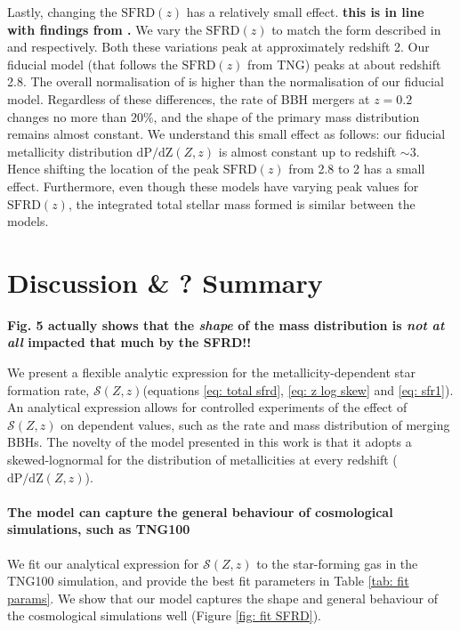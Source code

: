 \documentclass[twocolumn]{aastex631}
\newcommand{\SFRDzZ}{\ensuremath{\mathcal{S}(Z,z)}\xspace}
\newcommand{\SFRDz}{\ensuremath{\mathrm{SFRD}(z)}\xspace}
\newcommand{\dpdZ}{\ensuremath{\mathrm{dP/dZ}(Z,z)}\xspace}
\newcommand{\todo}[1]{{\color{purple}\bf{#1}}}
\begin{document}
Lastly, changing the \SFRDz has a relatively small effect. 
\todo{this is in line with findings from \citep{Tang+2020}.}
We vary the \SFRDz to match the form described in \cite{Madau+2017} and \cite{Neijssel+2019} respectively. Both these variations peak at approximately redshift 2. Our fiducial model (that follows the \SFRDz from TNG) peaks at about redshift 2.8. The overall normalisation of \cite{Neijssel+2019} is higher than the normalisation of our fiducial model. Regardless of these differences, the rate of BBH mergers at $z=0.2$ changes no more than $20\%$, and the shape of the primary mass distribution remains almost constant. We understand this small effect as follows: our fiducial metallicity distribution \dpdZ is almost constant up to redshift $\sim3$. Hence shifting the location of the peak \SFRDz from 2.8 to 2 has a small effect. Furthermore, even though these models have varying peak values for \SFRDz, the integrated total stellar mass formed is similar between the models. %


\section{Discussion \& ? Summary \label{sec: summary}}
\todo{\cite{chruslinska2022_review} Fig. 5 actually shows that the \textit{shape} of the mass distribution is \textit{not at all} impacted that much by the SFRD!!}

We present a flexible analytic expression for the metallicity-dependent star formation rate, \SFRDzZ (equations \ref{eq: total sfrd}, \ref{eq: z log skew} and \ref{eq: sfr1}). An analytical expression allows for controlled experiments of the effect of \SFRDzZ on dependent values, such as the rate and mass distribution of merging BBHs. The novelty of the model presented in this work is that it adopts a skewed-lognormal for the distribution of metallicities at every redshift (\dpdZ). 

\paragraph{The model can capture the general behaviour of cosmological simulations, such as TNG100}
We fit our analytical expression for \SFRDzZ to the star-forming gas in the TNG100 simulation, and provide the best fit parameters in Table \ref{tab: fit params}. We show that our model captures the shape and general behaviour of the cosmological simulations well (Figure \ref{fig: fit SFRD}). 
\end{document}
